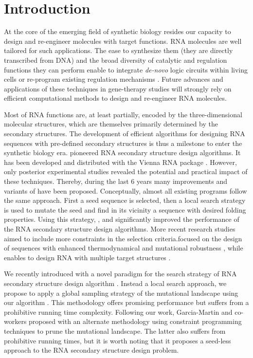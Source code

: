 \section{Introduction}
\label{sec:introduction}

At the core of the emerging field of synthetic biology resides our capacity to design and re-engineer molecules with target functions. RNA molecules are well tailored for such applications. The ease to synthesize them (they are directly transcribed from DNA) and the broad diversity of catalytic and regulation functions they can perform enable to integrate \textit{de-novo} logic  circuits within living cells \cite{Rodrigo:2012fk} or re-program existing regulation mechanisms \cite{Chang:2012uq}. Future advances and applications of these techniques in gene-therapy studies will strongly rely on efficient computational methods to design and re-engineer RNA molecules.

Most of RNA functions are, at least partially, encoded by the three-dimensional molecular structures, which are themselves primarily determined by the secondary structures. The development of efficient algorithms for designing RNA sequences with pre-defined secondary structures is thus a milestone to enter the synthetic biology era. \RNAinverse pioneered RNA secondary structure design algorithms. It has been developed and distributed with the Vienna RNA package \cite{Hofacker:1994}. However, only posterior experimental studies revealed the potential and practical impact of these techniques. Thereby, during the last 6 years many improvements and variants of \RNAinverse have been proposed. Conceptually, almost all existing programs follow the same approach. First a seed sequence is selected, then a local search strategy is used to mutate the seed and find in its vicinity a sequence with desired folding properties. Using this strategy, \INFORNA \cite{Busch:2006uq}, \RNASSD \cite{Aguirre-Hernandez:2007kx} and \NUPACK \cite{Zadeh:2011fk} significantly improved the performance of the RNA secondary structure design algorithms. More recent research studies aimed to include more constraints in the selection criteria.\RNAexinv focused on the design of sequences with enhanced thermodynamical and mutational robustness \cite{Avihoo:2011fk}, while \frankenstein enables to design RNA with multiple target structures \cite{Lyngso:2012vn}.

We recently introduced with \RNAensign a novel paradigm for the search strategy of RNA secondary structure design algorithm \cite{Levin:2012kx}. Instead a local search approach, we propose to apply a global sampling strategy of the mutational landscape using our \RNAmutants algorithm \cite{Waldispuhl2008}. This methodology offers promising performance but  suffers from a prohibitive running time complexity. Following our work, Garcia-Martin and co-workers proposed with \RNAiFOLD an alternate methodology using constraint programming techniques to prune the mutational landscape. The latter also suffers from prohibitive running times, but it is worth noting that it proposes a seed-less approach to the RNA secondary structure design problem.

